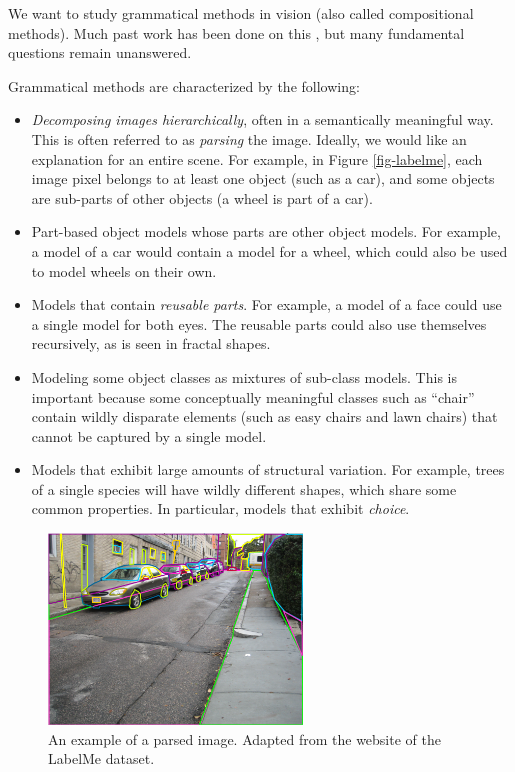 

We want to study grammatical methods in vision (also called
compositional methods). Much past work has been done on this
\cite{pop, potter-geman-bienenstock, ks-fu, potter-geman-chi, 
  grenander, zhu-han, jin-geman, potter, zhu-tu-chen-yuille,
  zhu-chen-yuille, zhu-mumford}, but many fundamental questions remain
unanswered.

Grammatical methods are characterized by the following:
\begin{itemize}
\item \emph{Decomposing images hierarchically}, often in a semantically
  meaningful way. This is often referred to as \emph{parsing} the
  image. Ideally, we would like an explanation for an entire
  scene. For example, in Figure \ref{fig-labelme}, each image pixel
  belongs to at least one object (such as a car), and some objects are
  sub-parts of other objects (a wheel is part of a car).
\item Part-based object models whose parts are other object
  models. For example, a model of a car would contain a model for a
  wheel, which could also be used to model wheels on their own.
\item Models that contain \emph{reusable parts}. For example, a model of a
  face could use a single model for both eyes. The reusable parts
  could also use themselves recursively, as is seen in fractal shapes.
\item Modeling some object classes as mixtures of sub-class
  models. This is important because some conceptually meaningful
  classes such as ``chair'' contain wildly disparate elements (such as
  easy chairs and lawn chairs) that cannot be captured by a single
  model.
\item Models that exhibit large amounts of structural variation. For
  example, trees of a single species will have wildly different
  shapes, which share some common properties. In particular, models
  that exhibit \emph{choice}.
\end{itemize}


\begin{figure}[p]
\includegraphics[height=2in]{images/labelmeparse.png}
\caption{An example of a parsed image. Adapted from the website of the
  LabelMe dataset.}
\end{figure}

